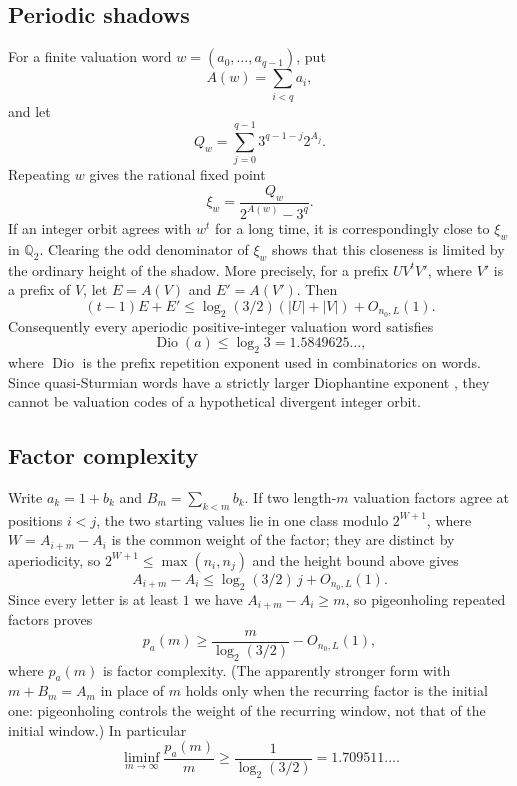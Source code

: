 \documentclass[11pt,reqno]{amsart}
\theoremstyle{plain}
\theoremstyle{definition}
\numberwithin{equation}{section}
\newcommand{\Qp}[1]{\mathbb{Q}_{#1}}
\DeclareMathOperator{\Dio}{Dio}
\begin{document}
\subsection{Periodic shadows}

For a finite valuation word $w=(a_0,\ldots,a_{q-1})$, put
\[
A(w)=\sum_{i<q}a_i,
\]
and let
\[
Q_w=\sum_{j=0}^{q-1}3^{q-1-j}2^{A_j}.
\]
Repeating $w$ gives the rational fixed point
\begin{equation}\label{eq:shadowfix}
\xi_w=\frac{Q_w}{2^{A(w)}-3^q}.
\end{equation}
If an integer orbit agrees with $w^t$ for a long time, it is correspondingly
close to $\xi_w$ in $\Qp{2}$.  Clearing the odd denominator of $\xi_w$
shows that this closeness is limited by the ordinary height of the shadow.
More precisely, for a prefix $UV^tV'$, where $V'$ is a prefix of $V$, let
$E=A(V)$ and $E'=A(V')$.  Then
\begin{equation}\label{eq:shadowheight}
(t-1)E+E'
\le
\log_2(3/2)(|U|+|V|)+O_{n_0,L}(1).
\end{equation}
Consequently every aperiodic positive-integer valuation word satisfies
\begin{equation}\label{eq:dio}
\Dio(a)\le\log_2 3=1.5849625\ldots,
\end{equation}
where $\Dio$ is the prefix repetition exponent used in combinatorics on words.
Since quasi-Sturmian words have a strictly larger Diophantine exponent
\cite{adamczewski2010}, they cannot be valuation codes of a hypothetical
divergent integer orbit.

\subsection{Factor complexity}

Write $a_k=1+b_k$ and $B_m=\sum_{k<m}b_k$.  If two length-$m$ valuation
factors agree at positions $i<j$, the two starting values lie in one class
modulo $2^{W+1}$, where $W=A_{i+m}-A_i$ is the common weight of the factor;
they are distinct by aperiodicity, so $2^{W+1}\le\max(n_i,n_j)$ and the height
bound above gives
\[
A_{i+m}-A_i
\le \log_2(3/2)\,j+O_{n_0,L}(1).
\]
Since every letter is at least $1$ we have $A_{i+m}-A_i\ge m$, so pigeonholing
repeated factors proves
\begin{equation}\label{eq:complexity}
p_a(m)
\ge
\frac{m}{\log_2(3/2)}-O_{n_0,L}(1),
\end{equation}
where $p_a(m)$ is factor complexity.  (The apparently stronger form with
$m+B_m=A_m$ in place of $m$ holds only when the recurring factor is the
initial one: pigeonholing controls the weight of the recurring window, not
that of the initial window.)  In particular
\[
\liminf_{m\to\infty}\frac{p_a(m)}m
\ge\frac1{\log_2(3/2)}=1.709511\ldots.
\]
\end{document}
